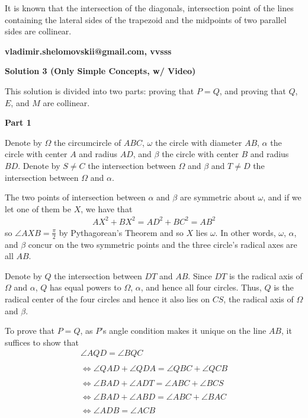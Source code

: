 \begin{enumerate}
 It is known that the intersection of the diagonals, intersection point of the lines containing the lateral sides of the trapezoid and the midpoints of two parallel sides are collinear.

 \textbf{vladimir.shelomovskii@gmail.com, vvsss}

 



\textbf{Solution 3 (Only Simple Concepts, w/ Video)}

This solution is divided into two parts: proving that $P = Q$, and proving that $Q$, $E$, and $M$ are collinear.

 \textbf{Part 1}

 Denote by $\Omega$ the circumcircle of $ABC$, $\omega$ the circle with diameter $AB$, $\alpha$ the circle with center $A$ and radius $AD$, and $\beta$ the circle with center $B$ and radius $BD$. Denote by $S \neq C$ the intersection between $\Omega$ and $\beta$ and $T \neq D$ the intersection between $\Omega$ and $\alpha$.

 The two points of intersection between $\alpha$ and $\beta$ are symmetric about $\omega$, and if we let one of them be $X$, we have that\begin{align*}AX^2 + BX^2 = AD^2 + BC^2 = AB^2\end{align*}
so $\angle AXB = \frac{\pi}{2}$ by Pythagorean's Theorem and so $X$ lies $\omega$. In other words, $\omega$, $\alpha$, and $\beta$ concur on the two symmetric points and the three circle's radical axes are all $AB$.

 Denote by $Q$ the intersection between $DT$ and $AB$. Since $DT$ is the radical axis of $\Omega$ and $\alpha$, $Q$ has equal powers to $\Omega$, $\alpha$, and hence all four circles. Thus, $Q$ is the radical center of the four circles and hence it also lies on $CS$, the radical axis of $\Omega$ and $\beta$.

 To prove that $P = Q$, as $P$'s angle condition makes it unique on the line $AB$, it suffices to show that\begin{align*}\angle AQD = \angle BQC \\\\\Longleftrightarrow \angle QAD + \angle QDA = \angle QBC + \angle QCB \\\\\Longleftrightarrow \angle BAD + \angle ADT = \angle ABC + \angle BCS \\\\\Longleftrightarrow \angle BAD + \angle ABD = \angle ABC + \angle BAC \\\\\Longleftrightarrow \angle ADB = \angle ACB\end{align*}



\end{enumerate}
